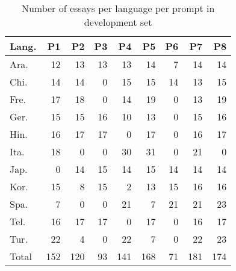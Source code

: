 \documentclass[11pt,letterpaper]{article}
\begin{document}
\begin{table*}[htb]
    \label{tab:prompts-dev}
    \begin{center}
        \begin{tabular}{lrrrrrrrr}
            \hline
            \textbf{Lang.} & \textbf{P1} & \textbf{P2} & \textbf{P3} & \textbf{P4} & \textbf{P5} & \textbf{P6} & \textbf{P7} & \textbf{P8}\\ \hline
            Ara.     &   12 & 13 & 13 & 13 & 14 & 7  & 14 & 14  \\ \hline
            Chi.    &   14 & 14 & 0  & 15 & 15 & 14 & 13 & 15  \\ \hline
            Fre.     &   17 & 18 & 0  & 14 & 19 & 0  & 13 & 19  \\ \hline
            Ger.     &   15 & 15 & 16 & 10 & 13 & 0  & 15 & 16  \\ \hline
            Hin.      &   16 & 17 & 17 & 0  & 17 & 0  & 16 & 17  \\ \hline
            Ita.    &   18 & 0  & 0  & 30 & 31 & 0  & 21 & 0   \\ \hline
            Jap.   &   0  & 14 & 15 & 14 & 15 & 14 & 14 & 14  \\ \hline
            Kor.     &   15 & 8  & 15 & 2  & 13 & 15 & 16 & 16  \\ \hline
            Spa.    &   7  & 0  & 0  & 21 & 7  & 21 & 21 & 23  \\ \hline
            Tel.     &   16 & 17 & 17 & 0  & 17 & 0  & 16 & 17  \\ \hline
            Tur.    &   22 & 4  & 0  & 22 & 7  & 0  & 22 & 23  \\ \hline \hline
            Total      &   152& 120& 93 & 141& 168& 71 & 181& 174 \\ \hline
        \end{tabular}
    \end{center}
    \caption{Number of essays per language per prompt in development set}
\end{table*}
\end{document}
